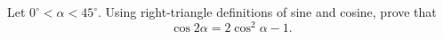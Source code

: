 Let $0^\circ<\alpha<45^\circ$. Using right-triangle definitions of sine and cosine, prove that
\[\cos2\alpha=2\cos^2\alpha-1 .\]
